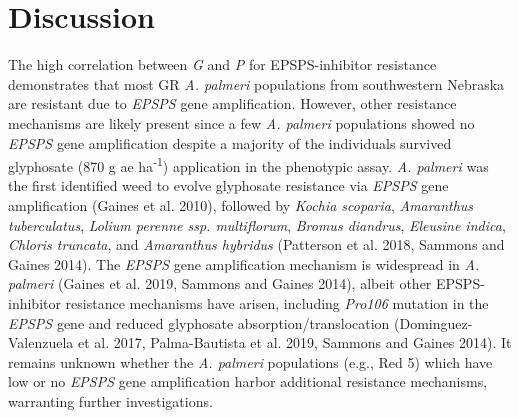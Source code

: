 \documentclass[
  12pt,
  a4paper]{article}
\begin{document}
\hypertarget{discussion}{%
\section{Discussion}\label{discussion}}

The high correlation between \emph{G} and \emph{P} for EPSPS-inhibitor
resistance demonstrates that most GR \emph{A. palmeri} populations from
southwestern Nebraska are resistant due to \emph{EPSPS} gene
amplification. However, other resistance mechanisms are likely present
since a few \emph{A. palmeri} populations showed no \emph{EPSPS} gene
amplification despite a majority of the individuals survived glyphosate
(870 g ae ha\textsuperscript{-1}) application in the phenotypic assay.
\emph{A. palmeri} was the first identified weed to evolve glyphosate
resistance via \emph{EPSPS} gene amplification (Gaines et al. 2010),
followed by \emph{Kochia scoparia}, \emph{Amaranthus tuberculatus},
\emph{Lolium perenne ssp. multiflorum}, \emph{Bromus diandrus},
\emph{Eleusine indica}, \emph{Chloris truncata}, and \emph{Amaranthus
hybridus} (Patterson et al. 2018, Sammons and Gaines 2014). The
\emph{EPSPS} gene amplification mechanism is widespread in \emph{A.
palmeri} (Gaines et al. 2019, Sammons and Gaines 2014), albeit other
EPSPS-inhibitor resistance mechanisms have arisen, including
\emph{Pro106} mutation in the \emph{EPSPS} gene and reduced glyphosate
absorption/translocation (Dominguez-Valenzuela et al. 2017,
Palma-Bautista et al. 2019, Sammons and Gaines 2014). It remains unknown
whether the \emph{A. palmeri} populations (e.g., Red 5) which have low
or no \emph{EPSPS} gene amplification harbor additional resistance
mechanisms, warranting further investigations.
\end{document}
